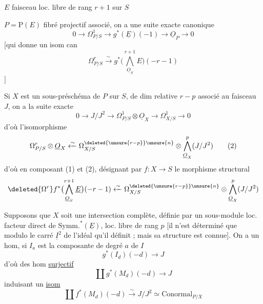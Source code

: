 $E$ faisceau loc. libre de rang $r+1$ sur $S$

$P=\mathrm{P}(E)$ fibré projectif associé, on a une suite exacte canonique
\[
0\longrightarrow\Omega^1_{P/S}\longrightarrow g^*(\underline E)(-1)\longrightarrow\underline O_P\longrightarrow0
\]
[qui donne un isom can
\[
\Omega^r_{P/S}\xrightarrow{\sim}g^*\bigl(\bigwedge_{\underline O_S}^{r+1}E\bigr)(-r-1)\tag*{(1)}
\]
\hfill$]$

Si  $X$ est un sous-préschéma de $P$  sur $S$, de dim relative $r-p$
associé au faisceau  $J$, on a la suite exacte
\[
0\longrightarrow J/J^2\longrightarrow\Omega^1_{P/S}\otimes\underline O_X\longrightarrow\Omega^1_{X/S}\longrightarrow0
\]
d'où l'isomorphisme
\[
\Omega^r_{P/S}\otimes\underline O_X\xleftarrow{\sim}\Omega^{\deleted{\unsure{r-p}}\unsure{n}}_{X/S}\otimes\bigwedge^p_{\underline O_X}(J/J^2)\tag*{(2)}
\]
d'où en composant (1) et (2), désignant par $f:X\to S$
le morphisme structural
\[
\deleted{\Omega^r}f^*\bigl(\bigwedge_{\underline O_S}^{r+1}\underline E\bigr)(-r-1)\xleftarrow{\sim}\Omega^{\deleted{\unsure{r-p}}\unsure{n}}_{X/S}\otimes\bigwedge^p_{\underline O_X}(J/J^2)
\]

Supposons que $X$ soit une intersection complète, définie
par un sous-module  loc. facteur direct de $\mathrm{Symm.}^{*}(\underline E)$,
 loc. libre de rang $p$ [il n'est 
déterminé que modulo le carré $\underline I^2$ de l'idéal qu'il
définit ; mais sa structure est connue]. On a
un hom, si $I_a$ est la composante de degré $a$ de $I$
\[
g^*(I_d)(-d)\longrightarrow J
\]
d'où des hom \uline{surjectif}
\[
\coprod g^*(M_d)(-d)\longrightarrow J
\]
induisant un \uline{isom}
\[
\coprod f^*(M_d)(-d)\xrightarrow{\sim}J/J^2\simeq\mathrm{Conormal}_{P/X}
\]

